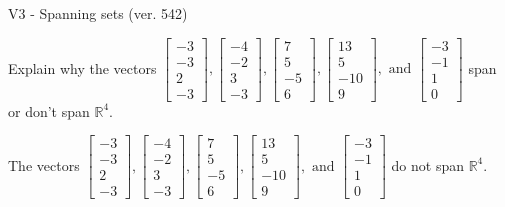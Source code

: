 \begin{exercise}
  \begin{exerciseTitle}V3 - Spanning sets (ver. 542)\end{exerciseTitle}
  \begin{exerciseStatement}
    Explain why the vectors \(\left[\begin{array}{r}
-3 \\
-3 \\
2 \\
-3
\end{array}\right] , \left[\begin{array}{r}
-4 \\
-2 \\
3 \\
-3
\end{array}\right] , \left[\begin{array}{r}
7 \\
5 \\
-5 \\
6
\end{array}\right] , \left[\begin{array}{r}
13 \\
5 \\
-10 \\
9
\end{array}\right] , \text{ and } \left[\begin{array}{r}
-3 \\
-1 \\
1 \\
0
\end{array}\right]\) span or don't span \(\mathbb{R}^4\). 
	


  \end{exerciseStatement}
  \begin{exerciseAnswer}
   The vectors \(\left[\begin{array}{r}
-3 \\
-3 \\
2 \\
-3
\end{array}\right] , \left[\begin{array}{r}
-4 \\
-2 \\
3 \\
-3
\end{array}\right] , \left[\begin{array}{r}
7 \\
5 \\
-5 \\
6
\end{array}\right] , \left[\begin{array}{r}
13 \\
5 \\
-10 \\
9
\end{array}\right] , \text{ and } \left[\begin{array}{r}
-3 \\
-1 \\
1 \\
0
\end{array}\right]\) 
  	 do not  
	span \(\mathbb{R}^4\).
  



\end{exerciseAnswer}
\end{exercise}
